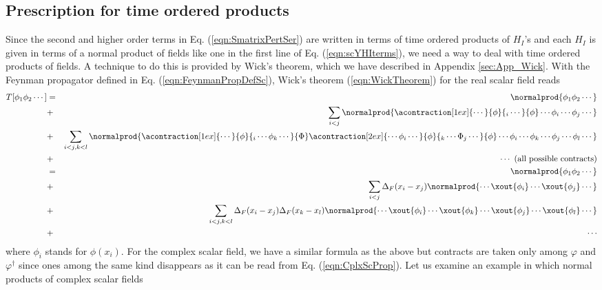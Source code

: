 \subsection{Prescription for time ordered products}
Since the second and higher order terms in Eq. (\ref{eqn:SmatrixPertSer})
are written in terms of time ordered products of $H_I$'s and
each $H_I$ is given in terms of a normal product of fields like
one in the first line of Eq. (\ref{eqn:scYHIterms}), 
we need a way to deal with time ordered products 
of fields. A technique to do this is provided by Wick's theorem, 
which we have described in Appendix \ref{sec:App_Wick}.
With the Feynman propagator defined in Eq. (\ref{eqn:FeynmanPropDefSc}),
Wick's theorem (\ref{eqn:WickTheorem}) for the real scalar field reads
\begin{eqnarray}
T[\phi_1 \phi_2 \cdots ]
&=&
\normalprod{\phi_1 \phi_2 \cdots }
\nonumber\\
&+&
\sum_{i < j}  
\normalprod{
\acontraction[1ex]{\cdots}{\phi}{{}_i\cdots}{\phi}
\cdots \phi_i \cdots \phi_j \cdots
}%
\nonumber\\
&+&
\sum_{i < j, k<l}  
\normalprod{
\acontraction[1ex]{\cdots}{\phi}{{}_i\cdots \phi_k \cdots}{\Phi}
\acontraction[2ex]{\cdots \phi_i \cdots }{\phi}{{}_k\cdots \Phi_j \cdots}{\phi}
\cdots \phi_i \cdots \phi_k \cdots  \phi_j \cdots \phi_l \cdots
}%
\nonumber\\
&+&
\cdots  \mbox{ (all possible contracts)}
\nonumber\\
&=&
\normalprod{\phi_1 \phi_2 \cdots }
\nonumber\\
&+&
\sum_{i < j}  
\Delta_F(x_i - x_j)
\normalprod{
\cdots \xout{\phi_i} \cdots \xout{\phi_j} \cdots
}%
\nonumber\\
&+&
\sum_{i < j, k<l}  
\Delta_F(x_i - x_j)
\Delta_F(x_k - x_l)
\normalprod{
\cdots \xout{\phi_i} \cdots \xout{\phi_k} \cdots  \xout{\phi_j} \cdots \xout{\phi_l} \cdots
}%
\nonumber\\
&+&
\cdots
\nonumber\\
\label{eqn:WickTheoremRealSc}
\end{eqnarray}
where $\phi_i$ stands for $\phi(x_i)$.
For the complex scalar field, we have a similar formula as the above but
contracts are taken only among $\varphi$ and $\varphi^\dagger$ since
ones among the same kind disappears as it can be read from Eq.  (\ref{eqn:CplxScProp}).
Let us examine an example in which normal products of complex scalar fields 
